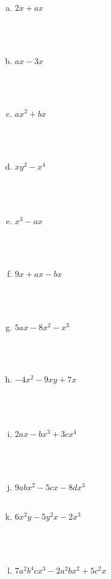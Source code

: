 \documentclass[a4paper,14pt]{article}
\begin{document}
\begin{multicols}{2}
\begin{enumerate}
\begin{enumerate}[a)]
    			\item $2x + ax$ \\\\\\\\
    			\item $ax - 3x$ \\\\\\\\
    			\item $ax^2 + bx$ \\\\\\\\
    			\item $xy^2 - x^4$ \\\\\\\\
    			\item $x^3 - ax$ \\\\\\\\
    			\item $9x + ax - bx$ \\\\\\\\
    			\item $5ax - 8x^2 - x^3$ \\\\\\\\
    			\item $-4x^2 - 9xy + 7x$ \\\\\\\\
    			\item $2ax - bx^3 + 3cx^4$ \\\\\\\\
    			\item $9abx^2 - 5cx - 8 dx^3$ \\\\
    			\item $6x^2y - 5y^2x - 2x^3$ \\\\\\\\
    			\item $7a^2b^4cx^3 - 2a^2bx^2 + 5c^2x$ \\\\\\\\

\end{enumerate}
\end{enumerate}
\end{multicols}
\end{document}

